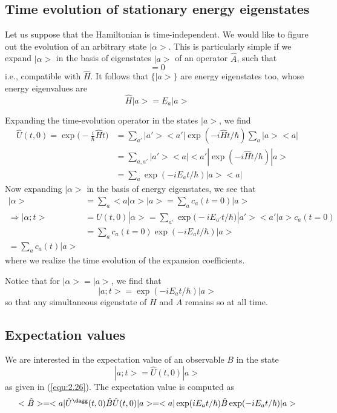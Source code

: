 \subsection{Time evolution of stationary energy eigenstates}
Let us suppose that the Hamiltonian is time-independent. We
would like to figure out the evolution of an arbitrary state
$|\alpha>$. This is particularly simple if we expand
$|\alpha>$ in the basis of eigenstates $|a>$ of an operator
$\hat{A}$, such that
\begin{equation}
  [\hat{A}, \hat{H}] = 0
  \label{equ:2.22}
\end{equation}
i.e., compatible with $\hat{H}$. It follows that $\{|a>\}$
are energy eigenstates too, whose energy eigenvalues are
\begin{equation}
  \hat{H} |a> = E_a |a>
  \label{equ:2.23}
\end{equation}

Expanding the time-evolution operator in the states $|a>$,
we find
\begin{align*}
  \hat{U}(t, 0) = \exp\Big(-\frac{i}{\hbar} \hat{H}t\Big) &= 
  \sum_{a'} |a'><a'| \exp(-i \hat{H} t / \hbar) \sum_a
  |a><a|\\
  &=
  \sum_{a,a'} |a'><a| <a'|\exp(-i\hat{H}t/\hbar) |a>\\
  &=
  \sum_a \exp(-i E_a t /\hbar) |a><a|
\end{align*}
Now expanding $|\alpha>$ in the basis of energy eigenstates,
we see that
\begin{align*}
|\alpha> &= \sum_a <a|\alpha> |a> = \sum_a c_a(t=0) |a> \\
  \Rightarrow |\alpha;t> &= U(t,0) |\alpha> = \sum_{a'}
  \exp\Big(-i E_{a'}t/\hbar\Big) |a'><a'|a> c_a(t=0) \\
  &=
  \sum_a c_a(t= 0) \exp(-iE_a t/\hbar) |a>\\
  = \sum_a c_a(t) |a>
\end{align*}
where we realize the time evolution of the expansion
coefficients.

Notice that for $|\alpha> = |a>$, we find that
\begin{equation}
  |a;t> = \exp(-i E_a t/\hbar) |a>
  \label{equ:2.25}
\end{equation}
so that any simultaneous eigenstate of $H$ and $A$ remains
so at all time.
\subsection{Expectation values}
We are interested in the expectation value of an observable
$B$ in the state
$$
  |a;t> = \hat{U}(t,0) |a>
$$
as given in (\ref{equ:2.26}). The expectation value is
computed as
$$
<\hat{B}> = <a|\hat{U}^{\dagg}(t,0) \hat{B} \hat{U}(t,0) |a>
= 
<a|\exp(iE_a t/\hbar) \hat{B} \exp(-i E_a t/\hbar) |a>
$$
